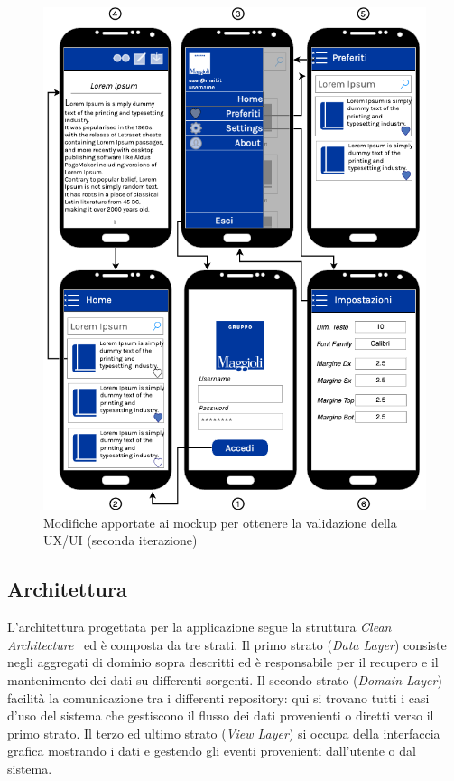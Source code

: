 \begin{figure}[H]
    \centering
    \includegraphics[width=1\textwidth]{img/mockup-uiux-2.png}
    \caption{Modifiche apportate ai mockup per ottenere la validazione della UX/UI (seconda iterazione)}
\end{figure}

\subsection{Architettura}
L'architettura progettata per la applicazione segue la struttura \textit{Clean Architecture}~\cite{martin2017architecture} ed è composta da tre strati. Il primo strato (\textit{Data Layer}) consiste negli aggregati di dominio sopra descritti ed è responsabile per il recupero e il mantenimento dei dati su differenti sorgenti. Il secondo strato (\textit{Domain Layer}) facilità la comunicazione tra i differenti repository: qui si trovano tutti i casi d'uso del sistema che gestiscono il flusso dei dati provenienti o diretti verso il primo strato. Il terzo ed ultimo strato (\textit{View Layer}) si occupa della interfaccia grafica mostrando i dati e gestendo gli eventi provenienti dall'utente o dal sistema.


